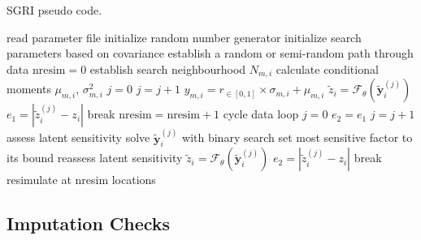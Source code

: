 \begin{algorithm}
    \caption{SGRI pseudo code.}\label{alg:sgri}
    \begin{algorithmic}[1]
        \State read parameter file
        \State initialize random number generator
        \State initialize search parameters based on covariance
         
        \State establish a random or semi-random path through data
        \State $\text{nresim} = 0$
         
         
        \State establish search neighbourhood $N_{m,i}$
        \State calculate conditional moments $\mu_{m,i}$, $\sigma_{m,i}^{2}$
        \EndFor {}
        \State $j = 0$
         
        \State $j = j + 1$
        \State $y_{m, i} = r_{\in[0,1]} \times \sigma_{m,i} + \mu_{m,i}$ 
        \EndFor
        \State $\tilde{z}_{i} = \mathcal{F}_{\theta}(\tilde{\mathbf{y}}_{i}^{{(j)}})$
        \State $e_{1} = |\tilde{z}_{i}^{(j)} - z_{i}|$ 
        \State break
        \EndIf
        \EndWhile {}
        \State $\text{nresim} = \text{nresim} + 1$
        \State cycle data loop
        \EndIf
        \State $j = 0$
        \State $e_{2} = e_{1}$
         
        \State $j = j + 1$
        \State assess latent sensitivity
        \State solve $\tilde{\mathbf{y}}_{i}^{(j)}$ with binary search
        \Else
        \State set most sensitive factor to its bound
        \State reassess latent sensitivity
        \EndIf
        \State $\tilde{z}_{i} = \mathcal{F}_{\theta}(\tilde{\mathbf{y}}_{i}^{(j)})$
        \State $e_{2} = |\tilde{z}_{i}^{(j)} - z_{i}|$ 
        \State break
        \EndIf
        \EndWhile {}
        \EndFor {}
        \State resimulate at nresim locations
        \EndIf
        \EndFor {}
    \end{algorithmic}
\end{algorithm}


\FloatBarrier
\subsection{Imputation Checks}
\label{subsec:05impcheck}

